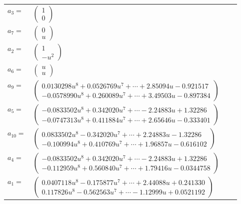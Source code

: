 \documentclass[1p]{elsarticle_modified}
\theoremstyle{definition}
\begin{document}
\begin{tabular}{m{7pt} m{180pt} m{7pt} m{180pt} }
\flushright $a_{3}=$&$\begin{pmatrix}1\\0\end{pmatrix}$ \\
\flushright $a_{7}=$&$\begin{pmatrix}0\\u\end{pmatrix}$ \\
\flushright $a_{2}=$&$\begin{pmatrix}1\\- u^2\end{pmatrix}$ \\
\flushright $a_{6}=$&$\begin{pmatrix}u\\u\end{pmatrix}$ \\
\flushright $a_{9}=$&$\begin{pmatrix}0.0130298 u^{8}+0.0526769 u^{7}+\cdots+2.85094 u-0.921517\\-0.0578990 u^{8}+0.260089 u^{7}+\cdots+3.49503 u-0.897384\end{pmatrix}$ \\
\flushright $a_{5}=$&$\begin{pmatrix}-0.0833502 u^{8}+0.342020 u^{7}+\cdots-2.24883 u+1.32286\\-0.0747313 u^{8}+0.411884 u^{7}+\cdots+2.65646 u-0.333401\end{pmatrix}$ \\
\flushright $a_{10}=$&$\begin{pmatrix}0.0833502 u^{8}-0.342020 u^{7}+\cdots+2.24883 u-1.32286\\-0.100994 u^{8}+0.410769 u^{7}+\cdots+1.96857 u-0.616102\end{pmatrix}$ \\
\flushright $a_{4}=$&$\begin{pmatrix}-0.0833502 u^{8}+0.342020 u^{7}+\cdots-2.24883 u+1.32286\\-0.112959 u^{8}+0.560840 u^{7}+\cdots+1.79416 u-0.0344758\end{pmatrix}$ \\
\flushright $a_{1}=$&$\begin{pmatrix}0.0407118 u^{8}-0.175877 u^{7}+\cdots+2.44088 u+0.241330\\0.117826 u^{8}-0.562563 u^{7}+\cdots-1.12999 u+0.0521192\end{pmatrix}$ \\

\end{tabular}
\end{document}
